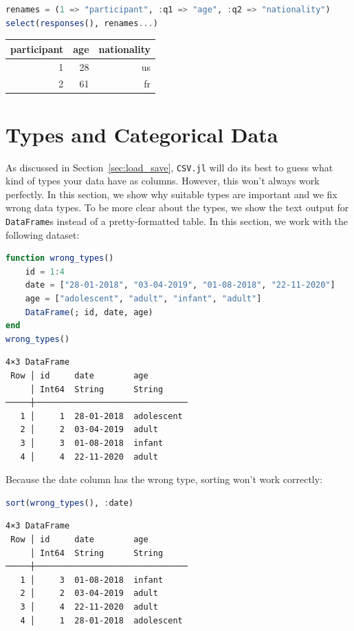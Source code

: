 \documentclass[
  notoc %
]{tufte-book}
\newcommand{\passthrough}[1]{#1}
\begin{document}
\begin{lstlisting}[language=Julia]
renames = (1 => "participant", :q1 => "age", :q2 => "nationality")
select(responses(), renames...)
\end{lstlisting}

\begin{longtable}[]{@{}rrr@{}}
\toprule()
participant & age & nationality \\
\midrule()
\endhead
1 & 28 & us \\
2 & 61 & fr \\
\bottomrule()
\end{longtable}

\hypertarget{sec:types}{%
\section{Types and Categorical Data}\label{sec:types}}

As discussed in Section~\ref{sec:load_save},
\passthrough{\lstinline!CSV.jl!} will do its best to guess what kind of
types your data have as columns. However, this won't always work
perfectly. In this section, we show why suitable types are important and
we fix wrong data types. To be more clear about the types, we show the
text output for \passthrough{\lstinline!DataFrame!}s instead of a
pretty-formatted table. In this section, we work with the following
dataset:

\begin{lstlisting}[language=Julia]
function wrong_types()
    id = 1:4
    date = ["28-01-2018", "03-04-2019", "01-08-2018", "22-11-2020"]
    age = ["adolescent", "adult", "infant", "adult"]
    DataFrame(; id, date, age)
end
wrong_types()
\end{lstlisting}

\begin{lstlisting}[language=Output]
4×3 DataFrame
 Row │ id     date        age
     │ Int64  String      String
─────┼───────────────────────────────
   1 │     1  28-01-2018  adolescent
   2 │     2  03-04-2019  adult
   3 │     3  01-08-2018  infant
   4 │     4  22-11-2020  adult
\end{lstlisting}

Because the date column has the wrong type, sorting won't work
correctly:

\begin{lstlisting}[language=Julia]
sort(wrong_types(), :date)
\end{lstlisting}

\begin{lstlisting}[language=Output]
4×3 DataFrame
 Row │ id     date        age
     │ Int64  String      String
─────┼───────────────────────────────
   1 │     3  01-08-2018  infant
   2 │     2  03-04-2019  adult
   3 │     4  22-11-2020  adult
   4 │     1  28-01-2018  adolescent
\end{lstlisting}
\end{document}
